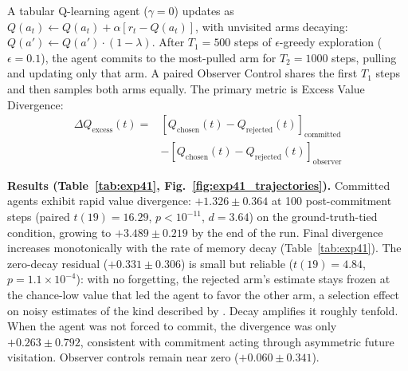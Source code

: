 \documentclass[conference]{IEEEtran}
\begin{document}
A tabular Q-learning agent ($\gamma=0$) updates as $Q(a_t)\leftarrow Q(a_t)+\alpha[r_t-Q(a_t)]$, with unvisited arms decaying: $Q(a')\leftarrow Q(a')\cdot(1-\lambda)$. After $T_1=500$ steps of $\epsilon$-greedy exploration ($\epsilon=0.1$), the agent commits to the most-pulled arm for $T_2=1000$ steps, pulling and updating only that arm. A paired Observer Control shares the first $T_1$ steps and then samples both arms equally. The primary metric is Excess Value Divergence:
\begin{equation}
    \begin{split}
        \Delta Q_{\text{excess}}(t) ={}& [Q_{\text{chosen}}(t)-Q_{\text{rejected}}(t)]_{\text{committed}} \\
        &- [Q_{\text{chosen}}(t)-Q_{\text{rejected}}(t)]_{\text{observer}}
    \end{split}
\end{equation}

\textbf{Results (Table~\ref{tab:exp41}, Fig.~\ref{fig:exp41_trajectories}).} Committed agents exhibit rapid value divergence: $+1.326\pm0.364$ at 100 post-commitment steps (paired $t(19)=16.29$, $p<10^{-11}$, $d=3.64$) on the ground-truth-tied condition, growing to $+3.489\pm0.219$ by the end of the run. Final divergence increases monotonically with the rate of memory decay (Table~\ref{tab:exp41}). The zero-decay residual ($+0.331\pm0.306$) is small but reliable ($t(19)=4.84$, $p=1.1\times10^{-4}$): with no forgetting, the rejected arm's estimate stays frozen at the chance-low value that led the agent to favor the other arm, a selection effect on noisy estimates of the kind described by \citet{chen2010choice}. Decay amplifies it roughly tenfold. When the agent was not forced to commit, the divergence was only $+0.263\pm0.792$, consistent with commitment acting through asymmetric future visitation. Observer controls remain near zero ($+0.060\pm0.341$).
\end{document}
